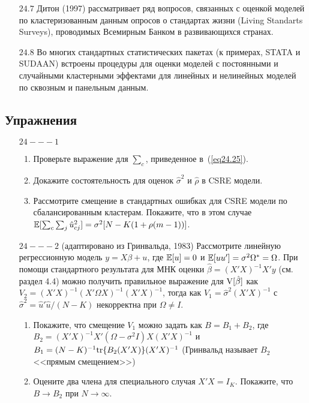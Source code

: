 \begin{enumerate}
\item[$24.7$] Дитон (1997) рассматривает ряд вопросов, связанных с оценкой моделей по кластеризованным данным опросов о стандартах жизни (Living Standarts Surveys), проводимых Всемирным Банком в развивающихся странах. 
\item[$24.8$] Во многих стандартных статистических пакетах (к примерах, STATA и SUDAAN) встроены процедуры для оценки моделей с постоянными и случайными кластерными эффектами для линейных и нелинейных моделей по сквозным и панельным данным. 
\end{enumerate}

\subsection*{Упражнения}

\begin{enumerate}
\item[$24 --- 1$]
\begin{enumerate}
\item Проверьте выражение для $\sum_c$, приведенное в~(\ref{eq24.25}).
\item Докажите состоятельность для оценок $\hat \sigma ^2$ и $\hat \rho$ в CSRE модели.
\item Рассмотрите смещение в стандартных ошибках для CSRE модели по сбалансированным кластерам. Покажите, что в этом случае $\mathbb{E} [\sum_c \sum_j \hat u^2_{cj}] = \sigma^2 [N - K (1 + \rho (m-1))]$. 
\end{enumerate}

\item[$24 --- 2$] (адаптировано из Гринвальда, 1983) Рассмотрите линейную регрессионную модель $y = X \beta + u$, где $\mathbb{E}[u] = 0$ и $\mathbb{E} [uu'] = \sigma^2 \Omega^* = \Omega$. При помощи стандартного результата для МНК оценки $\hat \beta = (X'X)^{-1} X'y$ (см. раздел 4.4) можно получить правильное выражение для $\mathrm{V}[\hat \beta]$ как $V_2 = (X'X)^{-1} (X' \Omega X)^{-1} (X'X)^{-1}$, тогда как $V_1 = \hat \sigma^2 (X'X)^{-1}$ с $\hat \sigma^2 = \hat u' \hat u / (N-K)$ некорректна при $\Omega \ne I$. 
\begin{enumerate}
\item Покажите, что смещение $V_1$ можно задать как $B = B_1 + B_2$, где $B_2 = (X'X)^{-1} X' (\Omega - \sigma^2 I) X (X'X)^{-1}$ и $B_1 = (N - K)^{-1} \mathrm{tr}\{B_2 (X'X)\} (X'X)^{-1}$ (Гринвальд называет $B_2$ <<прямым смещением>>)
\item Оцените два члена для специального случая $X'X = I_K$. Покажите, что $B \to B_2$ при $N \to \infty$. 
\end{enumerate}


\end{enumerate}
